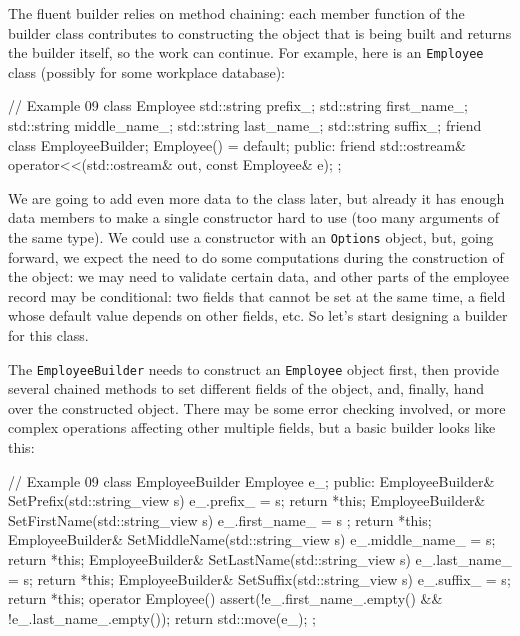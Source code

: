 The fluent builder relies on method chaining: each member function of the builder class contributes to constructing the object that is being built and returns the builder itself, so the work can continue. For example, here is an \texttt{Employee} class (possibly for some workplace database):

\begin{code}
// Example 09
class Employee {
  std::string prefix_;
  std::string first_name_;
  std::string middle_name_;
  std::string last_name_;
  std::string suffix_;
  friend class EmployeeBuilder;
  Employee() = default;
  public:
  friend std::ostream& operator<<(std::ostream& out,
                                  const Employee& e);
};
\end{code}

We are going to add even more data to the class later, but already it has enough data members to make a single constructor hard to use (too many arguments of the same type). We could use a constructor with an \texttt{Options} object, but, going forward, we expect the need to do some computations during the construction of the object: we may need to validate certain data, and other parts of the employee record may be conditional: two fields that cannot be set at the same time, a field whose default value depends on other fields, etc. So let's start designing a builder for this class.

The \texttt{EmployeeBuilder} needs to construct an \texttt{Employee} object first, then provide several chained methods to set different fields of the object, and, finally, hand over the constructed object. There may be some error checking involved, or more complex operations affecting other multiple fields, but a basic builder looks like this:

\begin{code}
// Example 09
class EmployeeBuilder {
  Employee e_;
  public:
  EmployeeBuilder& SetPrefix(std::string_view s) {
    e_.prefix_ = s; return *this;
  }
  EmployeeBuilder& SetFirstName(std::string_view s) {
    e_.first_name_ = s ; return *this;
  }
  EmployeeBuilder& SetMiddleName(std::string_view s) {
    e_.middle_name_ = s; return *this;
  }
  EmployeeBuilder& SetLastName(std::string_view s) {
    e_.last_name_ = s; return *this;
  }
  EmployeeBuilder& SetSuffix(std::string_view s) {
    e_.suffix_ = s; return *this;
  }
  operator Employee() {
    assert(!e_.first_name_.empty() &&
           !e_.last_name_.empty());
    return std::move(e_);
  }
};
\end{code}

